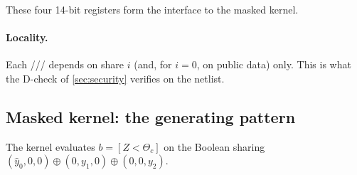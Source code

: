 These four 14-bit registers form the interface to the masked kernel.

\paragraph{Locality.} Each /// depends on share $i$ (and, for $i = 0$, on public data) only. This is what the D-check of \cref{sec:security} verifies on the netlist.

\subsection{Masked kernel: the generating pattern}\label{app:v-kernel}
The kernel evaluates $b = [Z < \Theta_c]$ on the Boolean sharing $(\hat y_0, 0, 0) \oplus (0, y_1, 0) \oplus (0, 0, y_2)$.
